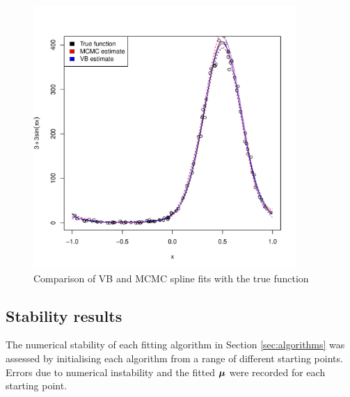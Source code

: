 \documentclass{article}[12pt]
\begin{document}
	
	\begin{figure}
		\label{fig:spline}
		\caption{Comparison of VB and MCMC spline fits with the true function}
		\includegraphics[width=100mm, height=100mm]{code/results/accuracy_plots_spline_gva2.pdf}
	\end{figure}
	
	
	\subsection{Stability results}
	
	The numerical stability of each fitting algorithm in Section \ref{sec:algorithms} was assessed by initialising
	each algorithm from a range of different starting points. Errors due to numerical instability and the fitted
	${\boldsymbol \mu}$ were recorded for each starting point.
	
\end{document}
